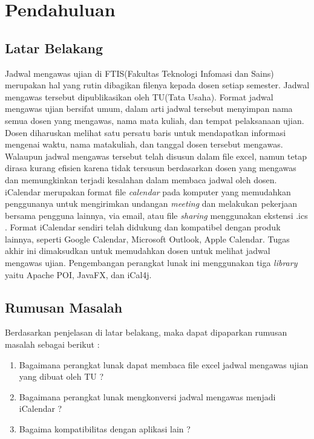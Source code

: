 \chapter{Pendahuluan}
\label{chap:intro}
   
\section{Latar Belakang}
\label{sec:latar_belakang}
\indent Jadwal mengawas ujian di FTIS(Fakultas Teknologi Infomasi dan Sains) merupakan hal yang rutin dibagikan filenya kepada dosen setiap semester. Jadwal mengawas tersebut dipublikasikan oleh TU(Tata Usaha). Format jadwal mengawas ujian bersifat umum, dalam arti jadwal tersebut menyimpan nama semua dosen yang mengawas, nama mata kuliah, dan tempat pelaksanaan ujian. Dosen diharuskan melihat satu persatu baris untuk mendapatkan informasi mengenai waktu, nama matakuliah, dan tanggal dosen tersebut mengawas. Walaupun jadwal mengawas tersebut telah disusun dalam file excel, namun tetap dirasa kurang efisien karena tidak tersusun berdasarkan dosen yang mengawas dan memungkinkan terjadi kesalahan dalam membaca jadwal oleh dosen. 
iCalendar merupakan format file \textit{calendar} pada komputer yang memudahkan penggunanya untuk mengirimkan undangan \textit{meeting} dan melakukan pekerjaan bersama pengguna lainnya, via email, atau file \textit{sharing} menggunakan ekstensi .ics . Format iCalendar sendiri telah didukung dan kompatibel dengan produk lainnya, seperti Google Calendar, Microsoft Outlook, Apple Calendar.
Tugas akhir ini dimaksudkan untuk memudahkan dosen untuk melihat jadwal mengawas ujian. Pengembangan perangkat lunak ini menggunakan tiga \textit{library} yaitu Apache POI, JavaFX, dan iCal4j.    

\section{Rumusan Masalah}
\label{sec:rumusan}
Berdasarkan penjelasan di latar belakang, maka dapat dipaparkan rumusan masalah sebagai berikut :
\begin{enumerate}
	\item Bagaimana perangkat lunak dapat membaca file excel jadwal mengawas ujian yang dibuat oleh TU ?
	\item Bagaimana perangkat lunak mengkonversi jadwal mengawas menjadi iCalendar ? 
	\item Bagaima kompatibilitas dengan aplikasi lain ? 
\end{enumerate}


